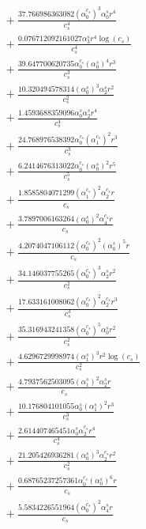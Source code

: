 \documentclass[10pt]{article}
\begin{document}
\begin{align*}
&{}  + \frac{37.766986363082 \left(\alpha_{0}^{c_s}\right)^{3} \alpha_{0}^s r^{4}}{c_{s}^{4}} \\
&{}  + \frac{0.076712092161027 \alpha_{3}^s r^{4} \log{\left(c_{s} \right)}}{c_{s}^{4}} \\
&{}  + \frac{39.647700620735 \alpha_{0}^{c_s} \left(\alpha_{0}^s\right)^{4} r^{3}}{c_{s}^{3}} \\
&{}  + \frac{10.320494578314 \left(\alpha_{0}^s\right)^{3} \alpha_{2}^s r^{2}}{c_{s}^{2}} \\
&{}  + \frac{1.4593688359096 \alpha_{0}^s \alpha_{2}^s r^{4}}{c_{s}^{4}} \\
&{}  + \frac{24.768976538392 \alpha_{0}^{c_s} \left(\alpha_{1}^{c_s}\right)^{2} r^{3}}{c_{s}^{3}} \\
&{}  + \frac{6.2414676313022 \alpha_{0}^{c_s} \left(\alpha_{0}^s\right)^{2} r^{5}}{c_{s}^{5}} \\
&{}  + \frac{1.8585804071299 \left(\alpha_{1}^{c_s}\right)^{2} \alpha_{2}^{c_s} r}{c_{s}} \\
&{}  + \frac{3.7897006163264 \left(\alpha_{0}^s\right)^{2} \alpha_{4}^{c_s} r}{c_{s}} \\
&{}  + \frac{4.2074047106112 \left(\alpha_{0}^{c_s}\right)^{2} \left(\alpha_{0}^s\right)^{5} r}{c_{s}} \\
&{}  + \frac{34.146037755265 \left(\alpha_{0}^{c_s}\right)^{3} \alpha_{2}^s r^{2}}{c_{s}^{2}} \\
&{}  + \frac{17.633161008062 \left(\alpha_{0}^{c_s}\right)^{2} \alpha_{2}^{c_s} r^{3}}{c_{s}^{3}} \\
&{}  + \frac{35.316943241358 \left(\alpha_{0}^{c_s}\right)^{5} \alpha_{0}^s r^{2}}{c_{s}^{2}} \\
&{}  + \frac{4.6296729998974 \left(\alpha_{1}^s\right)^{3} r^{2} \log{\left(c_{s} \right)}}{c_{s}^{2}} \\
&{}  + \frac{4.7937562503095 \left(\alpha_{1}^s\right)^{2} \alpha_{2}^s r}{c_{s}} \\
&{}  + \frac{10.176804101055 \alpha_{0}^s \left(\alpha_{1}^s\right)^{2} r^{3}}{c_{s}^{3}} \\
&{}  + \frac{2.614407465451 \alpha_{0}^s \alpha_{2}^{c_s} r^{4}}{c_{s}^{4}} \\
&{}  + \frac{21.205426936281 \left(\alpha_{0}^s\right)^{3} \alpha_{2}^{c_s} r^{2}}{c_{s}^{2}} \\
&{}  + \frac{0.68765237257361 \alpha_{0}^{c_s} \left(\alpha_{0}^s\right)^{6} r}{c_{s}} \\
&{}  + \frac{5.5834226551964 \left(\alpha_{0}^{c_s}\right)^{2} \alpha_{4}^s r}{c_{s}} \\

\end{align*}
\end{document}
